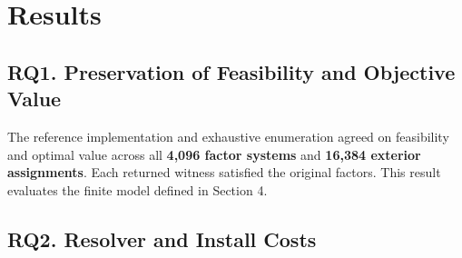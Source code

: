 \documentclass[
  11pt,
  letterpaper,
]{article}
\begin{document}
\section{Results}\label{results}

\subsection{RQ1. Preservation of Feasibility and Objective
Value}\label{rq1.-preservation-of-feasibility-and-objective-value}

The reference implementation and exhaustive enumeration agreed on
feasibility and optimal value across all \textbf{4,096 factor systems}
and \textbf{16,384 exterior assignments}. Each returned witness
satisfied the original factors. This result evaluates the finite model
defined in Section 4.

\subsection{RQ2. Resolver and Install
Costs}\label{rq2.-resolver-and-install-costs}
\end{document}
